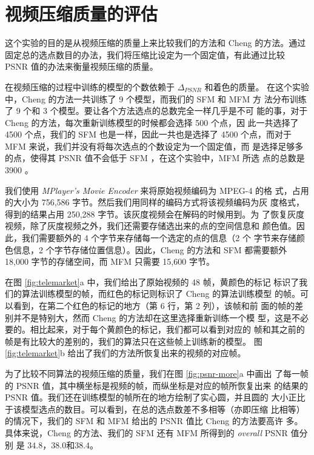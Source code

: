 \section{视频压缩质量的评估}

这个实验的目的是从视频压缩的质量上来比较我们的方法和 Cheng 的方法。通过
固定总的选点数目的办法，我们将压缩比设定为一个固定值，有此通过比较
PSNR 值的办法来衡量视频压缩的质量。

在视频压缩的过程中训练的模型的个数依赖于 $\Delta_{PSNR}$ 和着色的质量。
在这个实验中，Cheng 的方法一共训练了 9 个模型，而我们的 SFM 和 MFM 方
法分布训练了 9 个和 3 个模型。要让各个方法选点的总数完全一样几乎是不可
能的事，对于 Cheng 的方法，每次重新训练模型的时候都会选择 500 个点，因
此一共选择了 4500 个点，我们的 SFM 也是一样，因此一共也是选择了 4500
个点，而对于 MFM 来说，我们并没有将每次选点的个数设定为一个固定值，而
是选择足够多的点，使得其 PSNR 值不会低于 SFM ，在这个实验中，MFM 所选
点的总数是 3900 。

我们使用 {\em MPlayer's Movie Encoder} 来将原始视频编码为 MPEG-4 的格
式，占用的大小为 756,586 字节。然后我们用同样的编码方式将该视频编码为灰
度格式，得到的结果占用 250,288 字节。该灰度视频会在解码的时候用到。为
了恢复灰度视频，除了灰度视频之外，我们还需要存储选出来的点的空间信息和
颜色值。因此，我们需要额外的 4 个字节来存储每一个选定的点的信息（2 个
字节来存储颜色信息，2 个字节存储位置信息）。因此，Cheng 的方法和 SFM
都需要额外 18,000 字节的存储空间，而 MFM 只需要 15,600 字节。

在图 \ref{fig:telemarket}a 中，我们给出了原始视频的 48 帧，黄颜色的标记
标识了我们的算法训练模型的帧，而红色的标记则标识了 Cheng 的算法训练模型
的帧。可以看到，在第二个红色的标记的地方（第 6 行，第 2 列），该帧和前
面的帧的差别并不是特别大，然而 Cheng 的方法却在这里选择重新训练一个模
型，这是不必要的。相比起来，对于每个黄颜色的标记，我们都可以看到对应的
帧和其之前的帧是有比较大的差别的，我们的算法只在这些帧上训练新的模型。
图 \ref{fig:telemarket}b 给出了我们的方法所恢复出来的视频的对应帧。

为了比较不同算法的视频压缩的质量，我们在图 \ref{fig:psnr-more}a 中画出
了每一帧的 PSNR 值，其中横坐标是视频的帧，而纵坐标是对应的帧所恢复出来
的结果的 PSNR 值。我们还在训练模型的帧所在的地方绘制了实心圆，并且圆的
大小正比于该模型选点的数目。可以看到，在总的选点数差不多相等（亦即压缩
比相等）的情况下，我们的 SFM 和 MFM 给出的 PSNR 值比 Cheng 的方法要高许
多。具体来说，Cheng 的方法、我们的 SFM 还有 MFM 所得到的 {\em overall}
PSNR \cite{wavelet-based-rate-scalable-video-compression}值分别
是 $34.8$，$38.0$和$38.4$。

